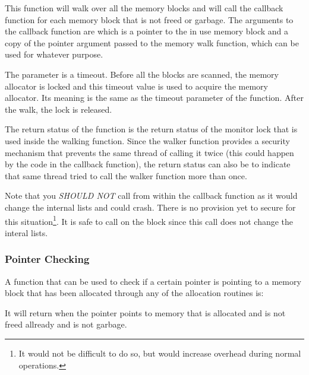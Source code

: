 
This function will walk over all the memory blocks and will call the
callback function  for each memory block that is not freed or
garbage. The arguments to the callback function are  which is a
pointer to the in use memory block and  a copy of the pointer
argument passed to the memory walk function, which can be used for whatever
purpose. 

The  parameter is a timeout. Before all the blocks are scanned,
the memory allocator is locked and this timeout value is used to acquire the
memory allocator. Its meaning is the same as the timeout parameter of the
 function. After the walk, the lock is released.

The return status of the function is the return status of the monitor lock
that is used inside the walking function. Since the walker function provides
a security mechanism that prevents the same thread of calling it twice
(this could happen by the code in the callback function), the return status
can also be  to indicate that same thread tried to
call the walker function more than once.

Note that you \textit{SHOULD NOT} call  from within the
callback function as it would change the internal lists and could crash.
There is no provision yet to secure for this situation\footnote{It would not
be difficult to do so, but would increase overhead during normal
operations.}. It is safe to call  on the block since
this call does not change the interal lists.

\subsubsection{Pointer Checking}

A function that can be used to check if a certain pointer is pointing to a
memory block that has been allocated through any of the allocation routines
is:


It will return  when the pointer points to memory that is
allocated and is not freed allready and is not garbage.
